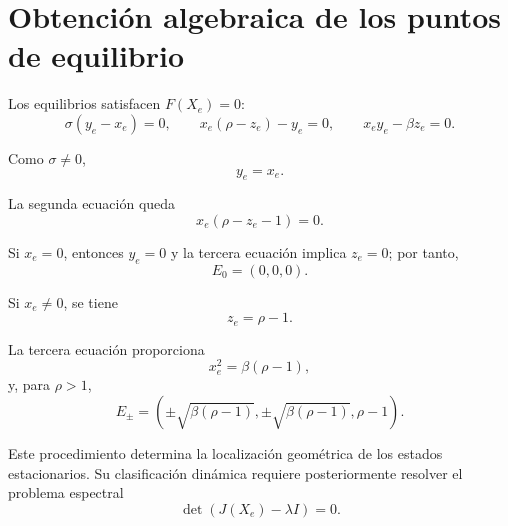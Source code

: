 \documentclass[12pt,a4paper,oneside]{report}
\theoremstyle{definition}
\numberwithin{equation}{chapter}
\begin{document}
\chapter{Obtención algebraica de los puntos de equilibrio}
\label{app:equilibrios}

Los equilibrios satisfacen \(F(X_e)=0\):
\begin{equation}
    \sigma(y_e-x_e)=0,\qquad x_e(\rho-z_e)-y_e=0,\qquad x_ey_e-\beta z_e=0.
\end{equation}

Como \(\sigma\neq0\),
\begin{equation}
    y_e=x_e.
\end{equation}

La segunda ecuación queda
\begin{equation}
    x_e(\rho-z_e-1)=0.
\end{equation}

Si \(x_e=0\), entonces \(y_e=0\) y la tercera ecuación implica \(z_e=0\); por tanto,
\begin{equation}
    E_0=(0,0,0).
\end{equation}

Si \(x_e\neq0\), se tiene
\begin{equation}
    z_e=\rho-1.
\end{equation}

La tercera ecuación proporciona
\begin{equation}
    x_e^2=\beta(\rho-1),
\end{equation}
y, para \(\rho>1\),
\begin{equation}
    E_\pm= \left( \pm\sqrt{\beta(\rho-1)}, \pm\sqrt{\beta(\rho-1)}, \rho-1 \right).
\end{equation}

Este procedimiento determina la localización geométrica de los estados estacionarios. Su clasificación dinámica requiere posteriormente resolver el problema espectral
\[
    \det\!\left(J(X_e)-\lambda I\right)=0.
\]
\end{document}
